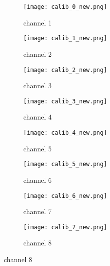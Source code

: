 \documentclass[a4paper, 11pt]{article}
\begin{document}
\begin{figure}
 
\begin{subfigure}{0.5\textwidth}
\texttt{[image: calib\_0\_new.png]} 
\caption{channel 1}
\label{fig:subim1}
\end{subfigure}
\begin{subfigure}{0.5\textwidth}
\texttt{[image: calib\_1\_new.png]}
\caption{channel 2}
\label{fig:subim2}
\end{subfigure}

\begin{subfigure}{0.5\textwidth}
\texttt{[image: calib\_2\_new.png]} 
\caption{channel 3}
\label{fig:subim1}
\end{subfigure}
\begin{subfigure}{0.5\textwidth}
\texttt{[image: calib\_3\_new.png]}
\caption{channel 4}
\label{fig:subim2}
\end{subfigure}

\begin{subfigure}{0.5\textwidth}
\texttt{[image: calib\_4\_new.png]} 
\caption{channel 5}
\label{fig:subim1}
\end{subfigure}
\begin{subfigure}{0.5\textwidth}
\texttt{[image: calib\_5\_new.png]}
\caption{channel 6}
\label{fig:subim2}
\end{subfigure}

\begin{subfigure}{0.5\textwidth}
\texttt{[image: calib\_6\_new.png]} 
\caption{channel 7}
\label{fig:subim1}
\end{subfigure}
\begin{subfigure}{0.5\textwidth}
\texttt{[image: calib\_7\_new.png]}
\caption{channel 8}
\label{fig:subim2}
\end{subfigure}
\end{figure}
\end{document}
